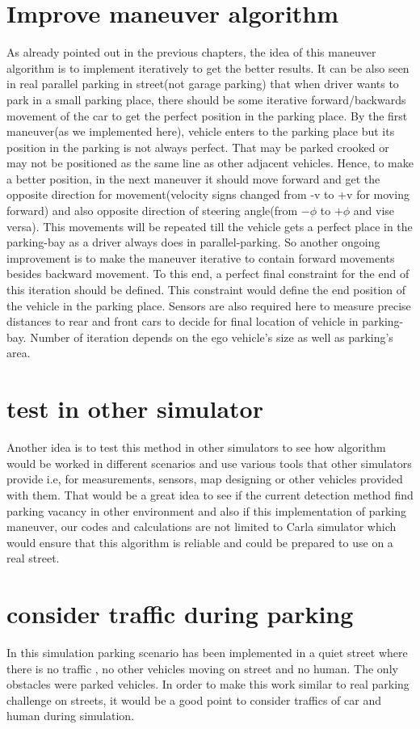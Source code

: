 \section{Improve maneuver algorithm}
As already pointed out in the previous chapters, the idea of this maneuver algorithm is to implement iteratively to get the better results. It can be also seen in real parallel parking in street(not garage parking) that when driver wants to park in a small parking place, there should be some iterative forward/backwards movement of the car to get the perfect position in the parking place. By the first maneuver(as we implemented here), vehicle enters to the parking place but its position in the parking is not always perfect. That may be parked crooked or may not be positioned as the same line as other adjacent vehicles. Hence, to make a better position, in the next maneuver it should move forward and get the opposite direction for movement(velocity signs changed from -v to +v for moving forward) and also opposite direction of steering angle(from $-\phi$ to $+\phi$ and vise versa). This movements will be repeated till the vehicle gets a perfect place in the parking-bay as a driver always does in parallel-parking. So another ongoing improvement is to make the maneuver iterative to contain forward movements besides backward movement. To this end, a perfect final constraint for the end of this iteration should be defined. This constraint would define the end position of the vehicle in the parking place. Sensors are also required here to measure precise distances to rear and front cars to decide for final location of vehicle in parking-bay. Number of iteration depends on the ego vehicle's size as well as parking's area. 
\section{test in other simulator}
Another idea is to test this method in other simulators to see how algorithm would be worked in different scenarios and use various tools that other simulators provide i.e, for measurements, sensors, map designing or other vehicles provided with them. That would be a great idea to see if the current detection method find parking vacancy in other environment and also if this implementation of parking maneuver, our codes and calculations are not limited to Carla simulator which would ensure that this algorithm is reliable and could be prepared to use on a real street.
\section{consider traffic during parking}
In this simulation parking scenario has been implemented in a quiet street where there is no traffic , no other vehicles moving on street and no human. The only obstacles were parked vehicles. In order to make this work similar to real parking challenge on streets, it would be a good point to consider traffics of car and human during simulation.

